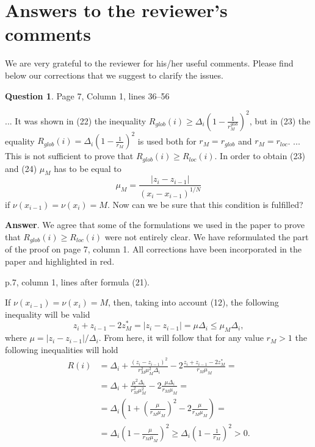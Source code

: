 \documentclass[12pt]{article}%
\begin{document}
\section*{Answers to the reviewer's comments}

We are very grateful to the reviewer for his/her useful comments. Please find below our corrections that we suggest to clarify the issues.

\phantom{f}

\textbf{Question 1}. Page 7, Column 1, lines 36--56

... It was shown in (22) the inequality $R_{glob}(i) \geq \Delta_i\left(1-\frac{1}{r_M^{glob}} \right)^2$, 
but in (23) the equality $R_{glob}(i) = \Delta_i \left(1-\frac{1}{r_M} \right)^2$ 
is used both for $r_M = r_{glob}$ and $r_M = r_{loc}$. ... 
This is not sufficient to prove that $R_{glob}(i)\geq R_{loc}(i)$.
In order to obtain (23) and (24) $\mu_M$ has to be equal to 
\[
\mu_M = \frac{\left|z_i-z_{i-1}\right|}{\left(x_i-x_{i-1}\right)^{1/N}}
\]
if $\nu(x_{i-1})=\nu(x_i)=M$. Now can we be sure that this condition is fulfilled?


\textbf{Answer}.
We agree that some of the formulations we used in the paper to prove that $R_{glob}(i)\geq R_{loc}(i)$ were not entirely clear.
We have reformulated the part of the proof on page 7, column 1. 
All corrections have been incorporated in the paper and highlighted in red.	

p.7, column 1, lines after formula (21).

If $\nu(x_{i-1}) = \nu(x_i) = M$, then, taking into account (12), the following inequality will be valid
$$
	z_i+z_{i-1}-2z_M^* = |z_i-z_{i-1}| = \mu \Delta_i \leq \mu_M\Delta_i,
$$
where $\mu = |z_i-z_{i-1}|/\Delta_i$.
From here, it will follow that for any value $r_M>1$ the following inequalities will hold
\begin{align}
	R(i) & = \Delta_i + \frac{(z_i-z_{i-1})^2}{r_M^2\mu_M^2\Delta_i} - 2\frac{z_i+z_{i-1}-2z_M^*}{r_M\mu_M} = \nonumber \\
	& = \Delta_i + \frac{\mu^2\Delta_i}{r_M^2\mu_M^2} - 2\frac{\mu\Delta_i}{r_M\mu_M} = \nonumber \\
  & = \Delta_i\left(1 + \left(\frac{\mu}{r_M\mu_M}\right)^2 - 2\frac{\mu}{r_M\mu_M}\right) = \nonumber \\
	& = \Delta_i\left(1 - \frac{\mu}{r_M\mu_M}\right)^2 \geq  \Delta_i \left( 1-\frac{1}{r_M}\right)^2 > 0.\nonumber
\end{align}
\end{document}
